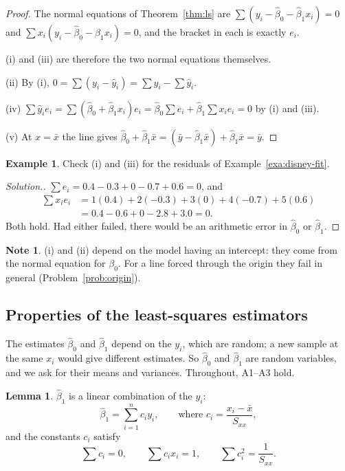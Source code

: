 \documentclass[11pt,a4paper]{article}
\numberwithin{equation}{section}
\theoremstyle{definition}
\newtheorem{exa}[thm]{Example}
\newtheorem{lem}[thm]{Lemma}
\newtheorem*{note}{Note}
\newenvironment{solution}
  {\renewcommand{\qedsymbol}{}\begin{proof}[\textit{Solution}.]}
  {\end{proof}}
\begin{document}
\begin{proof}
The normal equations of Theorem~\ref{thm:ls} are $\sum (y_i - \hat\beta_0 - \hat\beta_1 x_i) = 0$
and $\sum x_i (y_i - \hat\beta_0 - \hat\beta_1 x_i) = 0$, and the bracket in each is exactly
$e_i$.

(i) and (iii) are therefore the two normal equations themselves.

(ii) By (i), $0 = \sum (y_i - \hat y_i) = \sum y_i - \sum \hat y_i$.

(iv) $\sum \hat y_i e_i = \sum (\hat\beta_0 + \hat\beta_1 x_i) e_i
= \hat\beta_0 \sum e_i + \hat\beta_1 \sum x_i e_i = 0$ by (i) and (iii).

(v) At $x = \bar x$ the line gives $\hat\beta_0 + \hat\beta_1 \bar x
= (\bar y - \hat\beta_1 \bar x) + \hat\beta_1 \bar x = \bar y$.
\end{proof}

\begin{exa}
Check (i) and (iii) for the residuals of Example~\ref{exa:disney-fit}.
\end{exa}

\begin{solution}
$\sum e_i = 0.4 - 0.3 + 0 - 0.7 + 0.6 = 0$, and
\begin{align*}
\sum x_i e_i &= 1(0.4) + 2(-0.3) + 3(0) + 4(-0.7) + 5(0.6) \\
             &= 0.4 - 0.6 + 0 - 2.8 + 3.0 = 0 .
\end{align*}
Both hold. Had either failed, there would be an arithmetic error in $\hat\beta_0$ or
$\hat\beta_1$.
\end{solution}

\begin{note}
(i) and (ii) depend on the model having an intercept: they come from the normal equation
for $\beta_0$. For a line forced through the origin they fail in general
(Problem~\ref{prob:origin}).
\end{note}

\subsection{Properties of the least-squares estimators}
The estimates $\hat\beta_0$ and $\hat\beta_1$ depend on the $y_i$, which are random; a new
sample at the same $x_i$ would give different estimates. So $\hat\beta_0$ and $\hat\beta_1$
are random variables, and we ask for their means and variances. Throughout, A1--A3 hold.

\begin{lem}\label{lem:ci}
$\hat\beta_1$ is a linear combination of the $y_i$:
\[
\hat\beta_1 = \sum_{i=1}^n c_i y_i, \qquad\text{where } c_i = \frac{x_i - \bar x}{S_{xx}} ,
\]
and the constants $c_i$ satisfy
\[
\sum c_i = 0, \qquad \sum c_i x_i = 1, \qquad \sum c_i^2 = \frac{1}{S_{xx}} .
\]
\end{lem}
\end{document}
